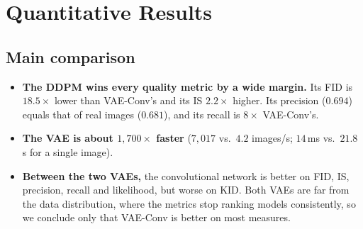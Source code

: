 \section{Quantitative Results}
\label{sec:results}

\subsection{Main comparison}

\begin{table}[H]
\centering\footnotesize
\setlength{\tabcolsep}{3.5pt}
\caption{Main results ($N=10{,}000$ samples against the CIFAR-10 training set). $\pm$: standard deviation over three
independent sample sets (evaluation noise). NFE: network evaluations per image. Bits/dim: test-set bound; it is a
property of the model, so both DDPM rows share it.}
\label{tab:main}
\end{table}

\begin{itemize}
  \item \textbf{The DDPM wins every quality metric by a wide margin.} Its FID is $18.5\times$ lower than VAE-Conv's
        and its IS $2.2\times$ higher. Its precision ($0.694$) equals that of real images ($0.681$), and its recall
        is $8\times$ VAE-Conv's.
  \item \textbf{The VAE is about $1{,}700\times$ faster} ($7{,}017$ vs.\ $4.2$ images/s; $14$\,ms vs.\ $21.8$\,s for a
        single image).
  \item \textbf{Between the two VAEs,} the convolutional network is better on FID, IS, precision, recall and
        likelihood, but worse on KID. Both VAEs are far from the data distribution, where the metrics stop ranking
        models consistently, so we conclude only that VAE-Conv is better on most measures.
\end{itemize}


